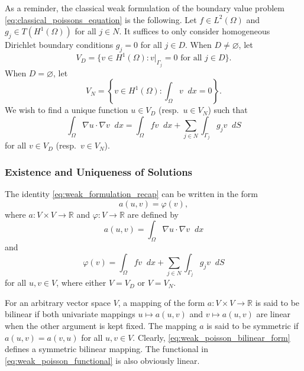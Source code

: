 \documentclass[english, 12pt, a4paper, sci, utf8, a-2b, online]{aaltothesis}
\theoremstyle{definition}
\theoremstyle{plain}
\newcommand*\diff{\mathop{}\!d}
\numberwithin{equation}{section}
\begin{document}
As a reminder, the classical weak formulation of the boundary value problem 
\eqref{eq:classical_poissons_equation} is the following.
Let $f \in L^2(\Omega)$ and $g_j \in T(H^1(\Omega))$ for all $j \in N$.
It suffices to only consider homogeneous Dirichlet boundary conditions $g_j = 0$ for all $j \in D$.
When $D \neq \varnothing$, let
\begin{equation}
    \label{eq:VD_test_space}
    V_D = \{ v \in H^1(\Omega)
        : v|_{\Gamma_j} = 0 \text{ for all } j \in D \}.
\end{equation}
When $D = \varnothing$, let
\begin{equation}
    \label{eq:VN_test_space}
    V_N = \left\{ v \in H^1(\Omega) : \int_{\Omega} v \diff x = 0 \right\}.
\end{equation}
We wish to find a unique function $u \in V_D$ (resp.\ $u \in V_N$) such that
\begin{equation}
    \label{eq:weak_formulation_recap}
    \int_{\Omega} \nabla u \cdot \nabla v \diff x
    = \int_{\Omega} fv \diff x + \sum_{j \in N} \int_{\Gamma_j} g_j v \diff S
\end{equation}
for all $v \in V_D$ (resp.\ $v \in V_N$).

\subsubsection{Existence and Uniqueness of Solutions}

The identity \eqref{eq:weak_formulation_recap} can be written in the form
\begin{equation}
    \label{eq:abstract_variational_identity}
    a(u,v) = \varphi(v),
\end{equation}
where $a: V \times V \to \mathbb{R}$ and $\varphi: V \to \mathbb{R}$
are defined by
\begin{equation}
    \label{eq:weak_poisson_bilinear_form}
    a(u,v) = \int_{\Omega} \nabla u \cdot \nabla v \diff x
\end{equation}
and
\begin{equation}
    \label{eq:weak_poisson_functional}
    \varphi(v) = \int_{\Omega} fv \diff x
        + \sum_{j \in N} \int_{\Gamma_j} g_j v \diff S
\end{equation}
for all $u,v \in V$, where either $V = V_D$ or $V = V_N$.

For an arbitrary vector space $V$, a mapping of the form $a: V \times V \to \mathbb{R}$
is said to be bilinear if both univariate mappings
$u \mapsto a(u,v)$ and $v \mapsto a(u,v)$ are linear when the other argument
is kept fixed. The mapping $a$ is said to be symmetric if
$a(u,v) = a(v,u)$ for all $u,v \in V$.
Clearly, \eqref{eq:weak_poisson_bilinear_form} defines a symmetric bilinear 
mapping. The functional in \eqref{eq:weak_poisson_functional}
is also obviously linear.
\end{document}
